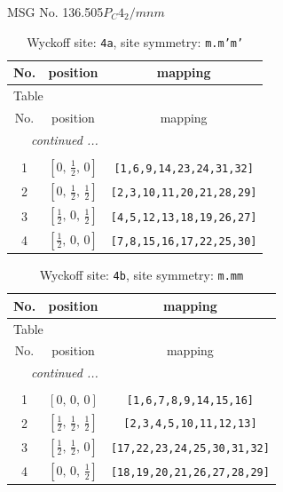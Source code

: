 \documentclass[fleqn,8pt]{jsarticle}
\begin{document}
\setcounter{MaxMatrixCols}{32}

\renewcommand{\tablename}{Table~}
\renewcommand{\figurename}{Figure~}
\begin{center}
\LARGE
MSG No. 136.505\quad$P_{C}4_{2}/mnm$
\end{center}
\renewcommand{\arraystretch}{1.2}
\begin{longtable}{ccc}
\caption{Wyckoff site: {\tt 4a}, site symmetry: {\tt m.m'm'}}
 \\
 \hline \hline
No. & position & mapping \\ \hline \endfirsthead

\multicolumn{2}{l}{\tablename\ \thetable{}} \\
 \hline \hline
No. & position & mapping \\ \hline \endhead

 \hline \hline
\multicolumn{2}{r}{\footnotesize\it continued ...} \\ \endfoot

 \hline \hline
\multicolumn{2}{r}{} \\ \endlastfoot

1 & $\left[ 0,\, \frac{1}{2},\, 0 \right]$ & {\tt [1,6,9,14,23,24,31,32]} \\ \hline
2 & $\left[ 0,\, \frac{1}{2},\, \frac{1}{2} \right]$ & {\tt [2,3,10,11,20,21,28,29]} \\ \hline
3 & $\left[ \frac{1}{2},\, 0,\, \frac{1}{2} \right]$ & {\tt [4,5,12,13,18,19,26,27]} \\ \hline
4 & $\left[ \frac{1}{2},\, 0,\, 0 \right]$ & {\tt [7,8,15,16,17,22,25,30]} \\
\end{longtable}
\renewcommand{\arraystretch}{1.2}
\begin{longtable}{ccc}
\caption{Wyckoff site: {\tt 4b}, site symmetry: {\tt m.mm}}
 \\
 \hline \hline
No. & position & mapping \\ \hline \endfirsthead

\multicolumn{2}{l}{\tablename\ \thetable{}} \\
 \hline \hline
No. & position & mapping \\ \hline \endhead

 \hline \hline
\multicolumn{2}{r}{\footnotesize\it continued ...} \\ \endfoot

 \hline \hline
\multicolumn{2}{r}{} \\ \endlastfoot

1 & $\left[ 0,\, 0,\, 0 \right]$ & {\tt [1,6,7,8,9,14,15,16]} \\ \hline
2 & $\left[ \frac{1}{2},\, \frac{1}{2},\, \frac{1}{2} \right]$ & {\tt [2,3,4,5,10,11,12,13]} \\ \hline
3 & $\left[ \frac{1}{2},\, \frac{1}{2},\, 0 \right]$ & {\tt [17,22,23,24,25,30,31,32]} \\ \hline
4 & $\left[ 0,\, 0,\, \frac{1}{2} \right]$ & {\tt [18,19,20,21,26,27,28,29]} \\
\end{longtable}
\end{document}
